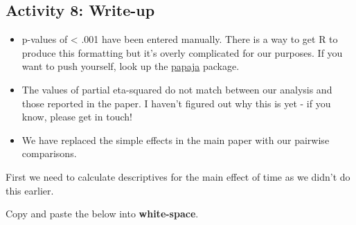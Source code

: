 \documentclass[]{book}
\newenvironment{Shaded}{\begin{snugshade}}{\end{snugshade}}
\newcommand{\DataTypeTok}[1]{\textcolor[rgb]{0.13,0.29,0.53}{#1}}
\newcommand{\FloatTok}[1]{\textcolor[rgb]{0.00,0.00,0.81}{#1}}
\newcommand{\KeywordTok}[1]{\textcolor[rgb]{0.13,0.29,0.53}{\textbf{#1}}}
\newcommand{\NormalTok}[1]{#1}
\newcommand{\OperatorTok}[1]{\textcolor[rgb]{0.81,0.36,0.00}{\textbf{#1}}}
\newcommand{\OtherTok}[1]{\textcolor[rgb]{0.56,0.35,0.01}{#1}}
\newcommand{\StringTok}[1]{\textcolor[rgb]{0.31,0.60,0.02}{#1}}
\providecommand{\tightlist}{%
  \setlength{\itemsep}{0pt}\setlength{\parskip}{0pt}}
\begin{document}
\hypertarget{activity-8-write-up}{%
\subsection{Activity 8: Write-up}\label{activity-8-write-up}}

\begin{itemize}
\tightlist
\item
  p-values of \textless{} .001 have been entered manually. There is a way to get R to produce this formatting but it's overly complicated for our purposes. If you want to push yourself, look up the \href{https://github.com/crsh/papaja}{papaja} package.
\item
  The values of partial eta-squared do not match between our analysis and those reported in the paper. I haven't figured out why this is yet - if you know, please get in touch!
\item
  We have replaced the simple effects in the main paper with our pairwise comparisons.
\end{itemize}

First we need to calculate descriptives for the main effect of time as we didn't do this earlier.

\begin{Shaded}
\end{Shaded}

Copy and paste the below into \textbf{white-space}.
\end{document}
